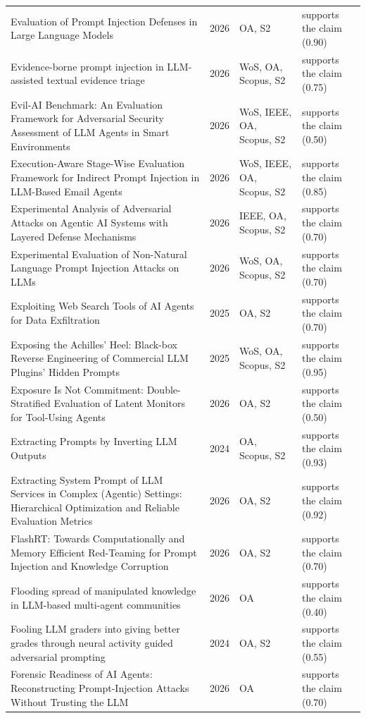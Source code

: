 \begin{longtable}{@{}%
  >{\raggedright\arraybackslash}p{}c%
  >{\raggedright\arraybackslash}p{}%
  >{\raggedright\arraybackslash}p{}@{}}
Evaluation of Prompt Injection Defenses in Large Language Models & 2026 & OA, S2 & supports the claim (0.90) \\
Evidence-borne prompt injection in LLM-assisted textual evidence triage & 2026 & WoS, OA, Scopus, S2 & supports the claim (0.75) \\
Evil-AI Benchmark: An Evaluation Framework for Adversarial Security Assessment of LLM Agents in Smart Environments & 2026 & WoS, IEEE, OA, Scopus, S2 & supports the claim (0.50) \\
Execution-Aware Stage-Wise Evaluation Framework for Indirect Prompt Injection in LLM-Based Email Agents & 2026 & WoS, IEEE, OA, Scopus, S2 & supports the claim (0.85) \\
Experimental Analysis of Adversarial Attacks on Agentic AI Systems with Layered Defense Mechanisms & 2026 & IEEE, OA, Scopus, S2 & supports the claim (0.70) \\
Experimental Evaluation of Non-Natural Language Prompt Injection Attacks on LLMs & 2026 & WoS, OA, Scopus, S2 & supports the claim (0.70) \\
Exploiting Web Search Tools of AI Agents for Data Exfiltration & 2025 & OA, S2 & supports the claim (0.70) \\
Exposing the Achilles' Heel: Black-box Reverse Engineering of Commercial LLM Plugins' Hidden Prompts & 2025 & WoS, OA, Scopus, S2 & supports the claim (0.95) \\
Exposure Is Not Commitment: Double-Stratified Evaluation of Latent Monitors for Tool-Using Agents & 2026 & OA, S2 & supports the claim (0.50) \\
Extracting Prompts by Inverting LLM Outputs & 2024 & OA, Scopus, S2 & supports the claim (0.93) \\
Extracting System Prompt of LLM Services in Complex (Agentic) Settings: Hierarchical Optimization and Reliable Evaluation Metrics & 2026 & OA, S2 & supports the claim (0.92) \\
FlashRT: Towards Computationally and Memory Efficient Red-Teaming for Prompt Injection and Knowledge Corruption & 2026 & OA, S2 & supports the claim (0.70) \\
Flooding spread of manipulated knowledge in LLM-based multi-agent communities & 2026 & OA & supports the claim (0.40) \\
Fooling LLM graders into giving better grades through neural activity guided adversarial prompting & 2024 & OA, S2 & supports the claim (0.55) \\
Forensic Readiness of AI Agents: Reconstructing Prompt-Injection Attacks Without Trusting the LLM & 2026 & OA & supports the claim (0.70) \\

\end{longtable}
